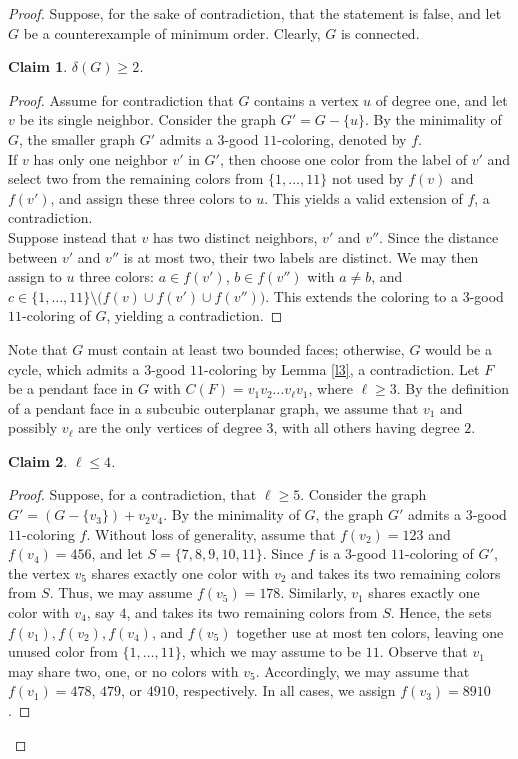 \documentclass[12pt]{article}
\numberwithin{theorem}{section}
\numberwithin{conjecture}{section}
\numberwithin{corollary}{section}
\numberwithin{example}{section}
\numberwithin{lemma}{section}
\numberwithin{proposition}{section}
\numberwithin{problem}{section}
\numberwithin{remark}{section}
\newtheorem{claim}{Claim}
\numberwithin{claim}{theorem}
\numberwithin{definition}{section}
\begin{document}
\begin{proof} 
Suppose, for the sake of contradiction, that the statement is false, and let $G$ be a counterexample of minimum order. Clearly, $G$ is connected.
 
\begin{claim}
    $\delta(G) \ge 2$.
\end{claim}

\begin{proof}
Assume for contradiction that $G$ contains a vertex $u$ of degree one, and let $v$ be its single neighbor. Consider the graph $G' = G - \{u\}$. By the minimality of $G$, the smaller graph $G'$ admits a $3$-good $11$-coloring, denoted by $f$.\\
\noindent If $v$ has only one neighbor $v'$ in $G'$, then choose one color from the label of $v'$ and select two from the remaining colors from $\{1,\dots,11\}$ not used by $f(v)$ and $f(v')$, and assign these three colors to $u$. This yields a valid extension of $f$, a contradiction.\\
\noindent Suppose instead that $v$ has two distinct neighbors, $v'$ and $v''$. Since the distance between $v'$ and $v''$ is at most two, their two labels are distinct. We may then assign to $u$ three colors: $a \in f(v')$, $b \in f(v'')$ with $a \ne b$, and $c \in \{1,\dots,11\}\setminus \bigl(f(v)\cup f(v')\cup f(v'')\bigr)$. This extends the coloring to a $3$-good $11$-coloring of $G$, yielding a contradiction.\end{proof}

\noindent Note that $G$ must contain at least two bounded faces; otherwise, $G$ would be a cycle, which admits a $3$-good $11$-coloring by Lemma \ref{l3}, a contradiction. Let $F$ be a pendant face in $G$ with $C(F) = v_1v_2 \dots v_\ell v_1$, where $\ell \ge 3$. By the definition of a pendant face in a subcubic outerplanar graph, we assume that $v_1$ and possibly $v_\ell$ are the only vertices of degree $3$, with all others having degree $2$.

\begin{claim}
   $\ell \leq 4$.
\end{claim}

\begin{proof}
Suppose, for a contradiction, that $\ell \ge 5$. Consider the graph 
$G' = (G - \{v_3\}) + v_2v_4$. By the minimality of $G$, the graph $G'$ admits a $3$-good $11$-coloring $f$. Without loss of generality, assume that $f(v_2) = 123$ and $f(v_4) = 456$, and let $S = \{7,8,9,10,11\}$. Since $f$ is a $3$-good $11$-coloring of $G'$, the vertex $v_5$ shares exactly one color with $v_2$ and takes its two remaining colors from $S$. Thus, we may assume $f(v_5) = 178$. Similarly, $v_1$ shares exactly one color with $v_4$, say $4$, and takes its two remaining colors from $S$. Hence, the sets $f(v_1), f(v_2), f(v_4)$, and $f(v_5)$ together use at most ten colors, leaving one unused color from $\{1,\dots,11\}$, which we may assume to be $11$. Observe that $v_1$ may share two, one, or no colors with $v_5$. Accordingly, we may assume that 
$f(v_1) = 478$, $479$, or $4910$, respectively. In all cases, we assign $f(v_3) = 8910$.


\end{proof}
\end{proof}
\end{document}
